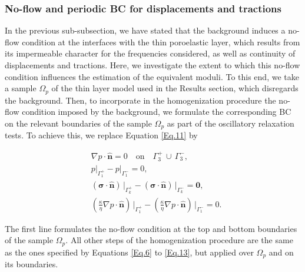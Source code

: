 \documentclass[draft]{agujournal2019}
\begin{document}
\subsubsection{No-flow and periodic BC for displacements and tractions} 
In the previous sub-subsection, we have stated that the background induces a no-flow condition at the interfaces with the thin poroelastic layer, which results from its impermeable character for the frequencies considered, as well as continuity of displacements and tractions. Here, we investigate the extent to which this no-flow condition influences the estimation of the equivalent moduli. To this end, we  take a sample $\Omega_p$ of the thin layer model used in the Results section, which disregards the background. Then, to incorporate in the homogenization procedure the no-flow condition imposed by the background, we formulate the corresponding BC on the relevant boundaries of the sample $\Omega_p$ as part of the  oscillatory relaxation tests. To achieve this, we replace Equation \ref{Eq.11} by
\begin{linenomath*}
\begin{equation}\label{Eq.14}
\begin{split}
& \nabla p \cdot \bm{\hat n}  = 0 \quad \text{on}\quad \Gamma_3^+ \, \cup \, \Gamma_3^-,\\
& p\vert_{\Gamma_1^+}-p\vert_{\Gamma_1^-} =0, \\
& \left(\bm{\sigma}\cdot \bm{\hat n} \right)\, \vert_{\Gamma_k^+}-\left(\bm{\sigma}\cdot \bm{\hat n} \right)\, \vert_{\Gamma_k^-} = \bm{0},\\
&\left( \frac{\kappa}{\eta} \nabla p \cdot \bm{\hat n} \right) \, \vert_{\Gamma_1^+} -\left( \frac{\kappa}{\eta} \nabla p \cdot \bm{\hat n} \right) \, \vert_{\Gamma_1^-} = 0.
\end{split}
\end{equation}
\end{linenomath*}
The first line formulates the no-flow condition at the top and bottom boundaries of the sample $\Omega_p$. All other steps of the homogenization procedure are the same as the ones specified by Equations \eqref{Eq.6} to \eqref{Eq.13}, but applied over $\Omega_p$ and on its boundaries.
\end{document}
